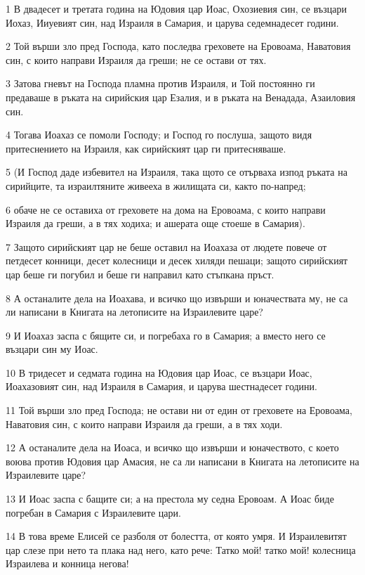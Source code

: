\par 1 В двадесет и третата година на Юдовия цар Иоас, Охозиевия син, се възцари Иохаз, Ииуевият син, над Израиля в Самария, и царува седемнадесет години.
\par 2 Той върши зло пред Господа, като последва греховете на Еровоама, Наватовия син, с които направи Израиля да греши; не се остави от тях.
\par 3 Затова гневът на Господа пламна против Израиля, и Той постоянно ги предаваше в ръката на сирийския цар Езалия, и в ръката на Венадада, Азаиловия син.
\par 4 Тогава Иоахаз се помоли Господу; и Господ го послуша, защото видя притеснението на Израиля, как сирийският цар ги притесняваше.
\par 5 (И Господ даде избевител на Израиля, така щото се отърваха изпод ръката на сирийците, та израилтяните живееха в жилищата си, както по-напред;
\par 6 обаче не се оставиха от греховете на дома на Еровоама, с които направи Израиля да греши, а в тях ходиха; и ашерата още стоеше в Самария).
\par 7 Защото сирийският цар не беше оставил на Иоахаза от людете повече от петдесет конници, десет колесници и десек хиляди пешаци; защото сирийският цар беше ги погубил и беше ги направил като стъпкана пръст.
\par 8 А останалите дела на Иоахава, и всичко що извърши и юначествата му, не са ли написани в Книгата на летописите на Израилевите царе?
\par 9 И Иоахаз заспа с бящите си, и погребаха го в Самария; а вместо него се възцари син му Иоас.
\par 10 В тридесет и седмата година на Юдовия цар Иоас, се възцари Иоас, Иоахазовият син, над Израиля в Самария, и царува шестнадесет години.
\par 11 Той върши зло пред Господа; не остави ни от един от греховете на Еровоама, Наватовия син, с които направи Израиля да греши, а в тях ходи.
\par 12 А останалите дела на Иоаса, и всичко що извърши и юначеството, с което воюва против Юдовия цар Амасия, не са ли написани в Книгата на летописите на Израилевите царе?
\par 13 И Иоас заспа с бащите си; а на престола му седна Еровоам. А Иоас биде погребан в Самария с Израилевите цари.
\par 14 В това време Елисей се разболя от болестта, от която умря. И Израилевитят цар слезе при нето та плака над него, като рече: Татко мой! татко мой! колесница Израилева и конница негова!
